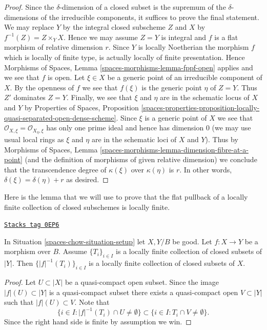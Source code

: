 \begin{proof}
Since the $\delta$-dimension of a closed subset is the supremum of
the $\delta$-dimensions of the irreducible components, it suffices
to prove the final statement. We may replace $Y$ by the
integral closed subscheme $Z$ and $X$ by $f^{-1}(Z) = Z \times_Y X$.
Hence we may assume $Z = Y$ is integral and $f$ is a flat morphism
of relative dimension $r$. Since $Y$ is locally Noetherian the
morphism $f$ which is locally of finite type,
is actually locally of finite presentation. Hence
Morphisms of Spaces, Lemma \ref{spaces-morphisms-lemma-fppf-open}
applies and we see that $f$ is open.
Let $\xi \in X$ be a generic point of an irreducible component
of $X$. By the openness of $f$ we see that $f(\xi)$ is the
generic point $\eta$ of $Z = Y$. Thus $Z'$ dominates $Z = Y$.
Finally, we see  that $\xi$ and $\eta$ are in the schematic
locus of $X$ and $Y$ by
Properties of Spaces, Proposition
\ref{spaces-properties-proposition-locally-quasi-separated-open-dense-scheme}.
Since $\xi$ is a generic point of $X$ we see that
$\mathcal{O}_{X, \xi} = \mathcal{O}_{X_\eta, \xi}$ has only one
prime ideal and hence has dimension $0$ (we may use usual
local rings as $\xi$ and $\eta$ are in the schematic loci
of $X$ and $Y$). Thus by Morphisms of Spaces, Lemma
\ref{spaces-morphisms-lemma-dimension-fibre-at-a-point}
(and the definition of morphisms of given relative dimension)
we conclude that the transcendence
degree of $\kappa(\xi)$ over $\kappa(\eta)$ is $r$.
In other words, $\delta(\xi) = \delta(\eta) + r$ as desired.
\end{proof}

Here is the lemma that we will use to prove that the flat pullback
of a locally finite collection of closed subschemes is locally finite.

\begin{lemma}
\label{spaces-chow-lemma-inverse-image-locally-finite}
\href{https://stacks.math.columbia.edu/tag/0EP6}{\texttt{Stacks tag 0EP6}}

In Situation \ref{spaces-chow-situation-setup} let $X, Y/B$ be good.
Let $f : X \to Y$ be a morphism over $B$.
Assume $\{T_i\}_{i \in I}$ is a locally
finite collection of closed subsets of $|Y|$.
Then $\{|f|^{-1}(T_i)\}_{i \in I}$ is a locally finite
collection of closed subsets of $X$.
\end{lemma}

\begin{proof}
Let $U \subset |X|$ be a quasi-compact open subset.
Since the image $|f|(U) \subset |Y|$ is a quasi-compact subset
there exists a quasi-compact open $V \subset |Y|$ such that
$|f|(U) \subset V$. Note that
$$
\{i \in I : |f|^{-1}(T_i) \cap U \not = \emptyset \}
\subset
\{i \in I : T_i \cap V \not = \emptyset \}.
$$
Since the right hand side is finite by assumption we win.
\end{proof}

